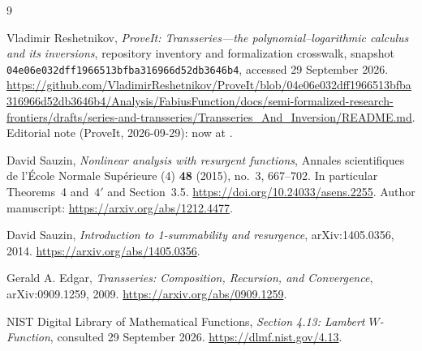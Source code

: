 \documentclass[11pt,a4paper]{article}
\numberwithin{equation}{section}
\theoremstyle{definition}
\theoremstyle{remark}
\begin{document}
\begin{thebibliography}{9}
\raggedright
{}
Vladimir Reshetnikov, \emph{ProveIt: Transseries---the polynomial--logarithmic calculus and its inversions}, repository inventory and formalization crosswalk, snapshot
\texttt{04e06e032dff1966513bfba316966d52db3646b4}, accessed 29 September 2026.
\url{https://github.com/VladimirReshetnikov/ProveIt/blob/04e06e032dff1966513bfba316966d52db3646b4/Analysis/FabiusFunction/docs/semi-formalized-research-frontiers/drafts/series-and-transseries/Transseries_And_Inversion/README.md}.
\newline Editorial note (ProveIt, 2026-09-29): now at .

David Sauzin, \emph{Nonlinear analysis with resurgent functions}, Annales scientifiques de l'\'Ecole Normale Sup\'erieure (4) \textbf{48} (2015), no.~3, 667--702. In particular Theorems~4 and~$4'$ and Section~3.5.
\url{https://doi.org/10.24033/asens.2255}.
Author manuscript: \url{https://arxiv.org/abs/1212.4477}.

David Sauzin, \emph{Introduction to 1-summability and resurgence}, arXiv:1405.0356, 2014.
\url{https://arxiv.org/abs/1405.0356}.

Gerald A. Edgar, \emph{Transseries: Composition, Recursion, and Convergence}, arXiv:0909.1259, 2009.
\url{https://arxiv.org/abs/0909.1259}.

NIST Digital Library of Mathematical Functions, \emph{Section 4.13: Lambert $W$-Function}, consulted 29 September 2026.
\url{https://dlmf.nist.gov/4.13}.
\end{thebibliography}
\end{document}
